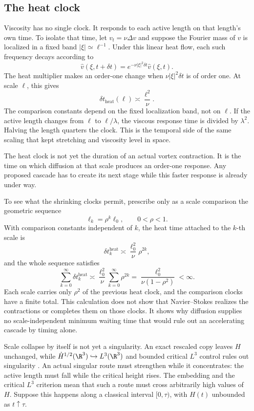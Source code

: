 \subsection{The heat clock}\label{sub:BodyHeatClock}

Viscosity has no single clock.
It responds to each active length on that length's own time.
To isolate that time, let \(v_t=\nu\Delta v\) and suppose the Fourier mass of \(v\) is localized in a fixed band \(|\xi|\simeq\ell^{-1}\).
Under this linear heat flow, each such frequency decays according to
\[
  \widehat v(\xi,t+\delta t)
  =e^{-\nu|\xi|^2\delta t}\widehat v(\xi,t).
\]
The heat multiplier makes an order-one change when \(\nu|\xi|^2\delta t\) is of order one.
At scale \(\ell\), this gives
\begin{equation}\label{eq:BodyHeatComparisonTime}
  \delta t_{\mathrm{heat}}(\ell)
  \asymp\frac{\ell^2}{\nu}.
\end{equation}
The comparison constants depend on the fixed localization band, not on \(\ell\).
If the active length changes from \(\ell\) to \(\ell/\lambda\), the viscous response time is divided by \(\lambda^2\).
Halving the length quarters the clock.
This is the temporal side of the same scaling that kept stretching and viscosity level in space.

The heat clock is not yet the duration of an actual vortex contraction.
It is the time on which diffusion at that scale produces an order-one response.
Any proposed cascade has to create its next stage while this faster response is already under way.

To see what the shrinking clocks permit, prescribe only as a scale comparison the geometric sequence
\[
  \ell_k=\rho^k\ell_0,
  \qquad
  0<\rho<1.
\]
With comparison constants independent of \(k\), the heat time attached to the \(k\)-th scale is
\[
  \delta t_k^{\mathrm{heat}}
  \asymp
  \frac{\ell_0^2}{\nu}\rho^{2k},
\]
and the whole sequence satisfies
\[
  \sum_{k=0}^{\infty}\delta t_k^{\mathrm{heat}}
  \asymp
  \frac{\ell_0^2}{\nu}
  \sum_{k=0}^{\infty}\rho^{2k}
  =
  \frac{\ell_0^2}{\nu(1-\rho^2)}
  <\infty.
\]
Each scale carries only \(\rho^2\) of the previous heat clock, and the comparison clocks have a finite total.
This calculation does not show that Navier--Stokes realizes the contractions or completes them on those clocks.
It shows why diffusion supplies no scale-independent minimum waiting time that would rule out an accelerating cascade by timing alone.

Scale collapse by itself is not yet a singularity.
An exact rescaled copy leaves \(H\) unchanged, while
\(\dot H^{1/2}(\R^3)\hookrightarrow L^3(\R^3)\) and bounded critical \(L^3\) control rules out singularity \parencite{EscauriazaSereginSverak2003}.
An actual singular route must strengthen while it concentrates: the active length must fall while the critical height rises.
The embedding and the critical \(L^3\) criterion mean that such a route must cross arbitrarily high values of \(H\).
Suppose this happens along a classical interval \([0,\tau)\), with \(H(t)\) unbounded as \(t\uparrow\tau\).

